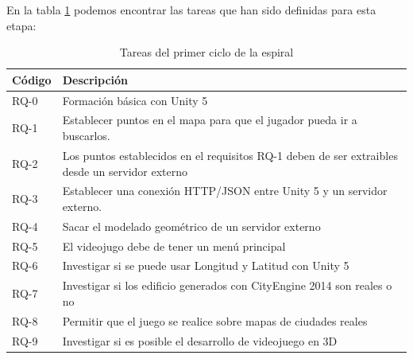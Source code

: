 En la tabla \ref{tabla:requisitosEtapa1} podemos encontrar las tareas que han sido definidas para esta etapa:

\begin{table}[H]
\begin{center}
\begin{tabular}{|p{1.5cm}| p{10.5cm}|}
\hline 
Código & Descripción \\
\hline \hline
RQ-0  & Formación básica con Unity 5\\ \hline
RQ-1  & Establecer puntos en el mapa para que el jugador pueda ir a buscarlos. \\ \hline
RQ-2  & Los puntos establecidos en el requisitos RQ-1 deben de ser extraibles desde un servidor externo\\ \hline
RQ-3  & Establecer una conexión HTTP/JSON entre Unity 5 y un servidor externo. \\ \hline
RQ-4  & Sacar el modelado geométrico de un servidor externo \\ \hline
RQ-5  & El videojugo debe de tener un menú principal \\ \hline
RQ-6  & Investigar si se puede usar Longitud y Latitud con Unity 5 \\ \hline
RQ-7  & Investigar si los edificio generados con CityEngine 2014 son reales o no \\ \hline
RQ-8  & Permitir que el juego se realice sobre mapas de ciudades reales \\ \hline
RQ-9  & Investigar si es posible el desarrollo de videojuego en 3D \\ \hline
\end{tabular}
\caption{Tareas del primer ciclo de la espiral}
\label{tabla:requisitosEtapa1}
\end{center}
\end{table}

